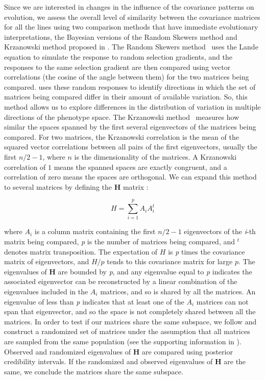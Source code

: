\begin{refsection}
Since we are interested in changes in the influence of the covariance
patterns on evolution, we assess the overall level of similarity between
the covariance matrices for all the lines using two comparison methods
that have immediate evolutionary interpretations, the Bayesian versions
of the Random Skewers method and Krzanowski method proposed in
\textcite{Aguirre2013-lp}. The Random Skewers method~\parencite{Cheverud2007-yp} uses the
Lande equation to simulate the response to random selection gradients,
and the responses to the same selection gradient are then compared using
vector correlations (the cosine of the angle between them) for the two
matrices being compared. \textcite{Aguirre2013-lp} uses these random responses to
identify directions in which the set of matrices being compared differ
in their amount of available variation. So, this method allows us to
explore differences in the distribution of variation in multiple
directions of the phenotype space. The Krzanowski
method~\parencite{Krzanowski1979-gj} measures how similar the spaces spanned by
the first several eigenvectors of the matrices being compared. For two
matrices, the Krzanowski correlation is the mean of the squared vector
correlations between all pairs of the first eigenvectors, usually the
first \(n/2 - 1\), where \(n\) is the dimensionality of the matrices. A
Krzanowski correlation of \(1\) means the spanned spaces are exactly
congruent, and a correlation of zero means the spaces are orthogonal. We
can expand this method to several matrices by defining the \textbf{H}
matrix \parencite{Krzanowski1979-gj}:

\[
H = \sum_{i=1}^p A_iA_i^t
\]

where \(A_i\) is a column matrix containing the first \(n/2 - 1\)
eigenvectors of the \emph{i}-th matrix being compared, \emph{p} is the
number of matrices being compared, and \(^t\) denotes matrix
transposition. The expectation of \(H\) is \emph{p} times the covariance
matrix of eigenvectors, and \(H/p\) tends to this covariance matrix for
large \(p\). The eigenvalues of \textbf{H} are bounded by \emph{p}, and
any eigenvalue equal to \emph{p} indicates the associated eigenvector
can be reconstructed by a linear combination of the eigenvalues included
in the \(A_i\) matrices, and so is shared by all the matrices. An
eigenvalue of less than \emph{p} indicates that at least one of the
\(A_i\) matrices can not span that eigenvector, and so the space is not
completely shared between all the matrices. In order to test if our
matrices share the same subspace, we follow \textcite{Aguirre2013-lp} and construct a
randomized set of matrices under the assumption that all matrices are
sampled from the same population (see the supporting information in
\textcite{Aguirre2013-lp}). Observed and randomized eigenvalues of \textbf{H} are
compared using posterior credibility intervals. If the randomized and
observed eigenvalues of \textbf{H} are the same, we conclude the
matrices share the same subspace.


\end{refsection}

